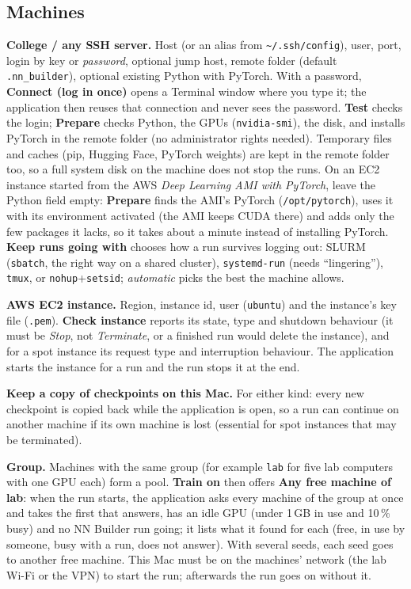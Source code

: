 \documentclass[11pt,a4paper]{article}
\newcommand{\ui}[1]{\textbf{\textsf{#1}}}
\newcommand{\file}[1]{\texttt{#1}}
\begin{document}
\subsection{Machines}
\textbf{College / any SSH server.} Host (or an alias from \file{\textasciitilde/.ssh/config}), user, port, login by key or
\emph{password}, optional jump host, remote folder (default \file{.nn\_builder}), optional existing Python with PyTorch. With a password,
\ui{Connect (log in once)} opens a Terminal window where you type it; the application then reuses that connection and never sees the
password. \ui{Test} checks the login; \ui{Prepare} checks Python, the GPUs (\texttt{nvidia-smi}), the disk, and installs PyTorch in the
remote folder (no administrator rights needed). Temporary files and caches (pip, Hugging Face, PyTorch weights) are kept in the
remote folder too, so a full system disk on the machine does not stop the runs. On an EC2 instance started from the AWS \emph{Deep Learning AMI with PyTorch}, leave
the Python field empty: \ui{Prepare} finds the AMI's PyTorch (\file{/opt/pytorch}), uses it with its environment activated (the AMI keeps
CUDA there) and adds only the few packages it lacks, so it takes about a minute instead of installing PyTorch. \ui{Keep runs going with} chooses how a run survives logging out: SLURM (\texttt{sbatch},
the right way on a shared cluster), \texttt{systemd-run} (needs ``lingering''), \texttt{tmux}, or \texttt{nohup}+\texttt{setsid};
\emph{automatic} picks the best the machine allows.

\textbf{AWS EC2 instance.} Region, instance id, user (\texttt{ubuntu}) and the instance's key file (\file{.pem}). \ui{Check instance}
reports its state, type and shutdown behaviour (it must be \emph{Stop}, not \emph{Terminate}, or a finished run would delete the
instance), and for a spot instance its request type and interruption behaviour. The application starts the instance for a run and the run
stops it at the end.

\textbf{Keep a copy of checkpoints on this Mac.} For either kind: every new checkpoint is copied back while the application is open,
so a run can continue on another machine if its own machine is lost (essential for spot instances that may be terminated).

\textbf{Group.} Machines with the same group (for example \texttt{lab} for five lab computers with one GPU each) form a pool.
\ui{Train on} then offers \ui{Any free machine of lab}: when the run starts, the application asks every machine of the group at once
and takes the first that answers, has an idle GPU (under 1\,GB in use and 10\,\% busy) and no NN Builder run going; it lists what it
found for each (free, in use by someone, busy with a run, does not answer). With several seeds, each seed goes to another free machine.
This Mac must be on the machines' network (the lab Wi-Fi or the VPN) to start the run; afterwards the run goes on without it.
\end{document}

